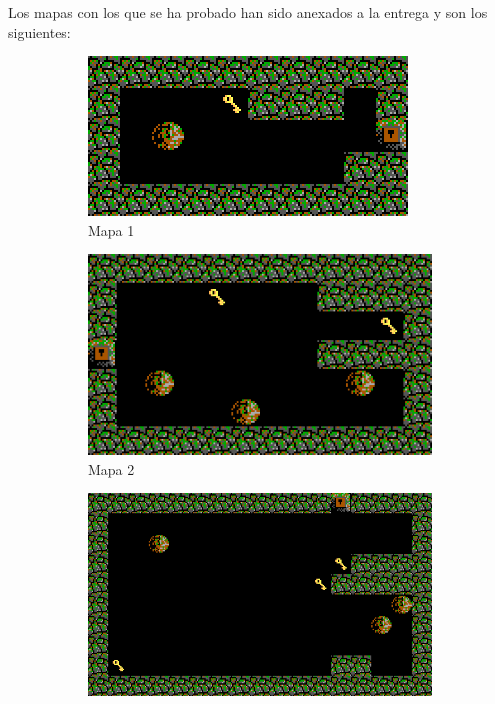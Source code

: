 \documentclass[11pt,spanish]{article}
\begin{document}
			Los mapas con los que se ha probado han sido anexados a la entrega y son los siguientes: \\
			\begin{figure}[h!]
				\begin{subfigure}[b]{0.45\linewidth}
					\includegraphics[width=\linewidth]{sat/lab1.png}
					\caption{Mapa 1}
				\end{subfigure}
				\begin{subfigure}[b]{0.54\linewidth}
					\includegraphics[width=\linewidth]{sat/lab2.png}
					\caption{Mapa 2}
				\end{subfigure}
				\begin{subfigure}[b]{0.40\linewidth}
					\includegraphics[width=\linewidth]{sat/lab3.png}

\end{subfigure}
\end{figure}
\end{document}
